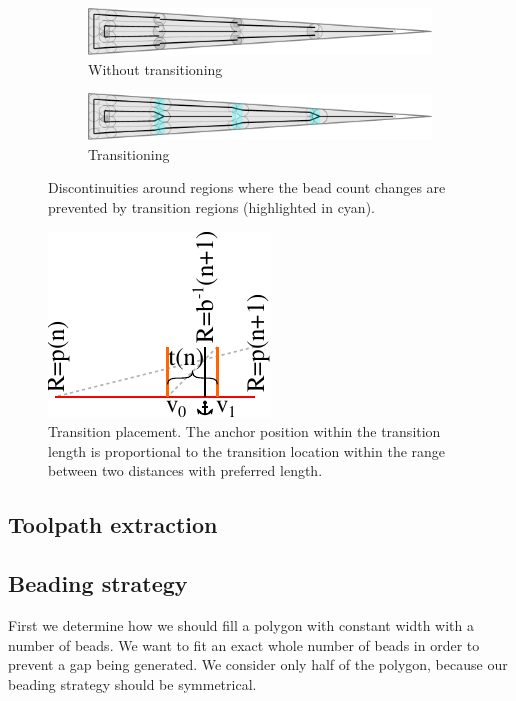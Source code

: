 \begin{figure}
\centering
\setlength{\figwidth}{\columnwidth}
\begin{subfigure}{0.9\figwidth}
\includegraphics[width=\columnwidth]{sources/method/wedge_distributed_generated__no_transitions.pdf}
\caption{Without transitioning}
\end{subfigure}
\begin{subfigure}{0.9\figwidth}
\includegraphics[width=\columnwidth]{sources/method/wedge_distributed_generated.pdf}
\caption{Transitioning}
\end{subfigure}
\caption{
Discontinuities around regions where the bead count changes are prevented by transition regions (highlighted in cyan).
}
\label{transitions}
\end{figure}


\begin{figure}
\centering
\includegraphics[width=.3\columnwidth]{sources/method/transition_location_precise.pdf}
\caption{
Transition placement.
The anchor position within the transition length is proportional to the transition location within the range between two distances with preferred length. 
}
\label{transition_placement}
\end{figure}








\subsection{Toolpath extraction}
\label{section_toolpath_extraction}



\subsection{Beading strategy}
First we determine how we should fill a 	polygon with constant width with a number of beads.
We want to fit an exact whole number of beads in order to prevent a gap being generated.
We consider only half of the polygon, because our beading strategy should be symmetrical.

